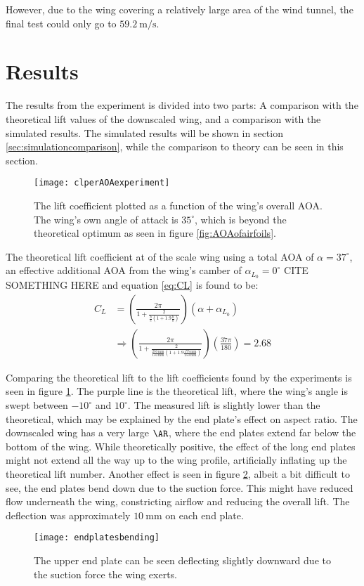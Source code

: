  However, due to the wing covering a relatively large area of the wind tunnel, the final test could only go to $\SI{59.2}{\metre\per\second}$.


\section{Results}

  The results from the experiment is divided into two parts: A comparison with the theoretical lift values of the downscaled wing, and a comparison with the simulated results. The simulated results will be shown in section \ref{sec:simulationcomparison}, while the comparison to theory can be seen in this section.

  \begin{figure}
    \texttt{[image: clperAOAexperiment]}
    \caption{The lift coefficient plotted as a function of the wing's overall AOA. The wing's own angle of attack is $35^\circ$, which is beyond the theoretical optimum as seen in figure \ref{fig:AOAofairfoils}.}
    \label{fig:clperAOAexperiment}
  \end{figure}

  The theoretical lift coefficient at of the scale wing using a total AOA of $\alpha = 37^\circ$, an effective additional AOA from the wing's camber of $\alpha_{L_0} = 0^\circ$ CITE SOMETHING HERE and equation \ref{eq:CL} is found to be:
  \begin{align*}
    C_L &= \left(\frac{2\pi}{1+\frac{2}{\frac{b}{c}\left(1+1.9\frac{h}{b}\right)}}\right)\left(\alpha + \alpha_{L_0}\right)\\
    &\Rightarrow
    \left(\frac{2\pi}{1+\frac{2}{\frac{\SI{250}{\milli\metre}}{\SI{150}{\milli\metre}}\left(1+1.9\frac{\SI{175}{\milli\metre}}{\SI{250}{\milli\metre}}\right)}}\right)\left(\frac{37\pi}{180}\right) = 2.68
  \end{align*}

  Comparing the theoretical lift to the lift coefficients found by the experiments is seen in figure \ref{fig:clperAOAexperiment}. The purple line is the theoretical lift, where the wing's angle is swept between $-10^\circ$ and $10^\circ$. The measured lift is slightly lower than the theoretical, which may be explained by the end plate's effect on aspect ratio. The downscaled wing has a very large $\AR$, where the end plates extend far below the bottom of the wing. While theoretically positive, the effect of the long end plates might not extend all the way up to the wing profile, artificially inflating up the theoretical lift number. Another effect is seen in figure \ref{fig:endplatesbending}, albeit a bit difficult to see, the end plates bend down due to the suction force. This might have reduced flow underneath the wing, constricting airflow and reducing the overall lift. The deflection was approximately $\SI{10}{\milli\metre}$ on each end plate.

  \begin{figure}
    \texttt{[image: endplatesbending]}
    \caption{The upper end plate can be seen deflecting slightly downward due to the suction force the wing exerts. }
    \label{fig:endplatesbending}
  \end{figure}
